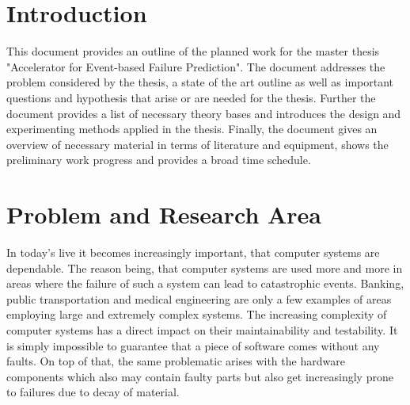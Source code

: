 \documentclass[12pt]{article} %
\begin{document}

\tableofcontents %

\newpage %


\section{Introduction} %

This document provides an outline of the planned work for the master thesis
"Accelerator for Event-based Failure Prediction". The document addresses the
problem considered by the thesis, a state of the art outline as well as
important questions and hypothesis that arise or are needed for the thesis.
Further the document provides a list of necessary theory bases and introduces
the design and experimenting methods applied in the thesis. Finally, the
document gives an overview of necessary material in terms of literature and
equipment, shows the preliminary work progress and provides a broad time
schedule.


\section{Problem and Research Area} %

In today's live it becomes increasingly important, that computer systems are
dependable. The reason being, that computer systems are used more and more in
areas where the failure of such a system can lead to catastrophic events.
Banking, public transportation and medical engineering are only a few examples
of areas employing large and extremely complex systems. The increasing
complexity of computer systems has a direct impact on their maintainability and
testability. It is simply impossible to guarantee that a piece of software comes
without any faults. On top of that, the same problematic arises with the
hardware components which also may contain faulty parts but also get
increasingly prone to failures due to decay of material.
\end{document}
